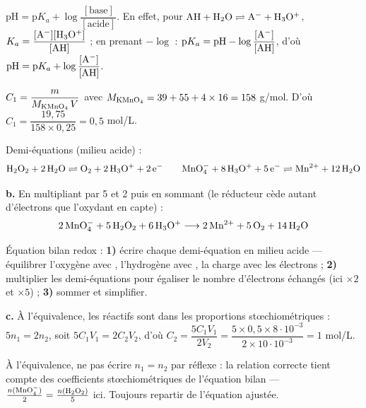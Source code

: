 \documentclass[11pt]{article}
\begin{document}
$\text{pH} = \text{p}K_a + \log\dfrac{[\text{base}]}{[\text{acide}]}$. En effet, pour $\mathrm{AH + H_2O \rightleftharpoons A^- + H_3O^+}$, $K_a = \dfrac{[\mathrm{A^-}][\mathrm{H_3O^+}]}{[\mathrm{AH}]}$ ; en prenant $-\log$ : $\text{p}K_a = \text{pH} - \log\dfrac{[\mathrm{A^-}]}{[\mathrm{AH}]}$, d'où $\text{pH} = \text{p}K_a + \log\dfrac{[\mathrm{A^-}]}{[\mathrm{AH}]}$.


 $C_1 = \dfrac{m}{M_{\mathrm{KMnO_4}}\,V}$ avec $M_{\mathrm{KMnO_4}} = 39 + 55 + 4\times 16 = 158$ g/mol. D'où $C_1 = \dfrac{19{,}75}{158\times 0{,}25} = 0{,}5$ mol/L.

 Demi-équations (milieu acide) :
\[ \mathrm{H_2O_2 + 2\,H_2O \rightleftharpoons O_2 + 2\,H_3O^+ + 2\,e^-} \qquad \mathrm{MnO_4^- + 8\,H_3O^+ + 5\,e^- \rightleftharpoons Mn^{2+} + 12\,H_2O} \]

\textbf{b.} En multipliant par 5 et 2 puis en sommant (le réducteur  cède autant d'électrons que l'oxydant  en capte) :
\[ \mathrm{2\,MnO_4^- + 5\,H_2O_2 + 6\,H_3O^+ \longrightarrow 2\,Mn^{2+} + 5\,O_2 + 14\,H_2O} \]

\begin{methode}
Équation bilan redox : \textbf{1)} écrire chaque demi-équation en
milieu acide — équilibrer l'oxygène avec , l'hydrogène avec
, la charge avec les électrons ; \textbf{2)} multiplier les
demi-équations pour égaliser le nombre d'électrons échangés (ici
$\times 2$ et $\times 5$) ; \textbf{3)} sommer et simplifier.
\end{methode}

\textbf{c.} À l'équivalence, les réactifs sont dans les proportions stœchiométriques : $5n_1 = 2n_2$, soit $5C_1V_1 = 2C_2V_2$, d'où $C_2 = \dfrac{5C_1V_1}{2V_2} = \dfrac{5\times 0{,}5\times 8\cdot10^{-3}}{2\times 10\cdot10^{-3}} = 1$ mol/L.

\begin{piege}
À l'équivalence, ne pas écrire $n_1 = n_2$ par réflexe : la relation
correcte tient compte des coefficients stœchiométriques de l'équation
bilan — $\frac{n(\mathrm{MnO_4^-})}{2} = \frac{n(\mathrm{H_2O_2})}{5}$ ici.
Toujours repartir de l'équation ajustée.
\end{piege}

\end{document}
